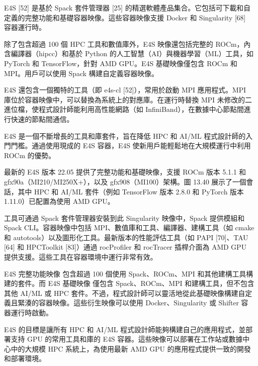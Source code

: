 E4S [52] 是基於 Spack 套件管理器 [25] 的精選軟體產品集合。它包括可下載和自定義的完整功能和基礎容器映像。這些容器映像支援 Docker 和 Singularity [68] 容器運行時。

除了包含超過 100 個 HPC 工具和數值庫外，E4S 映像還包括完整的 ROCm，內含編譯器（hipcc）和基於 Python 的人工智慧（AI）與機器學習（ML）工具，如 PyTorch 和 TensorFlow，針對 AMD GPU。E4S 基礎映像僅包含 ROCm 和 MPI。用戶可以使用 Spack 構建自定義容器映像。

E4S 還包含一個獨特的工具（即 e4s-cl [52]），常用於啟動 MPI 應用程式。MPI 庫位於容器映像中，可以替換為系統上的對應庫。在運行時替換 MPI 未修改的二進位檔，使程式設計師能利用高性能網路（如 InfiniBand），在數據中心節點間進行快速的節點間通信。

E4S 是一個不斷增長的工具和庫套件，旨在降低 HPC 和 AI/ML 程式設計師的入門門檻。通過使用現成的 E4S 容器，E4S 使新用戶能輕鬆地在大規模運行中利用 ROCm 的優勢。


最新的 E4S 版本 22.05 提供了完整功能和基礎映像，支援 ROCm 版本 5.1.1 和 gfx90a（MI210/MI250X+），以及 gfx908（MI100）架構。圖 13.40 展示了一個會話，其中 HPC 和 AI/ML 套件（例如 TensorFlow 版本 2.8.0 和 PyTorch 版本 1.11.0）已配置為使用 AMD GPU。

工具可通過 Spack 套件管理器安裝到此 Singularity 映像中，Spack 提供模組和 Spack CLI。容器映像中包括 MPI、數值庫和工具、編譯器、建構工具（如 cmake 和 autotools）以及圖形化工具。最新版本的性能評估工具（如 PAPI [70]、TAU [64] 和 HPCToolkit [83]）通過 rocProfiler 和 rocTracer 插桿介面為 AMD GPU 提供支援。這些工具在容器環境中運行非常有效。

E4S 完整功能映像 包含超過 100 個使用 Spack、ROCm、MPI 和其他建構工具構建的套件。而 E4S 基礎映像 僅包含 Spack、ROCm、MPI 和建構工具，但不包含其他 AI/ML 或 HPC 套件。不過，程式設計師可以靈活地從此基礎映像構建自定義且緊湊的容器映像。這些衍生映像可以使用 Docker、Singularity 或 Shifter 容器運行時啟動。

E4S 的目標是讓所有 HPC 和 AI/ML 程式設計師能夠構建自己的應用程式，並部署支持 GPU 的常用工具和庫的 E4S 容器。這些映像可以部署在工作站或數據中心中的大規模 HPC 系統上，為使用最新 AMD GPU 的應用程式提供一致的開發和部署環境。

